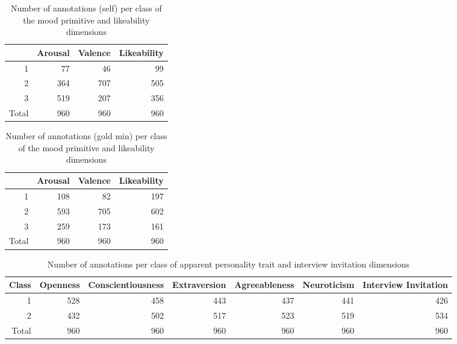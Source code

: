 \begin{table}[h]
\begin{tabular}{|r|r|r|r|}
\hline
\rowcolor[HTML]{C0C0C0} 
\multicolumn{1}{|l|}{\cellcolor[HTML]{C0C0C0}Class} &
  \multicolumn{1}{l|}{\cellcolor[HTML]{C0C0C0}Arousal} &
  \multicolumn{1}{l|}{\cellcolor[HTML]{C0C0C0}Valence} &
  \multicolumn{1}{l|}{\cellcolor[HTML]{C0C0C0}Likeability} \\ \hline
1                           & 77  & 46  & 99  \\
2                           & 364 & 707 & 505 \\
3                           & 519 & 207 & 356 \\ \hline
\multicolumn{1}{|l|}{Total} & 960 & 960 & 960 \\ \hline
\end{tabular}
\caption{Number of annotations (self) per class of the mood primitive and likeability dimensions}
\label{tab:selfcount}
\end{table}

\begin{table}[h]
\begin{tabular}{|r|r|r|r|}
\hline
\rowcolor[HTML]{C0C0C0} 
\multicolumn{1}{|l|}{\cellcolor[HTML]{C0C0C0}Class} &
  \multicolumn{1}{l|}{\cellcolor[HTML]{C0C0C0}Arousal} &
  \multicolumn{1}{l|}{\cellcolor[HTML]{C0C0C0}Valence} &
  \multicolumn{1}{l|}{\cellcolor[HTML]{C0C0C0}Likeability} \\ \hline
1                           & 108 & 82  & 197 \\
2                           & 593 & 705 & 602 \\
3                           & 259 & 173 & 161 \\ \hline
\multicolumn{1}{|l|}{Total} & 960 & 960 & 960 \\ \hline
\end{tabular}
\caption{Number of annotations (gold min) per class of the mood primitive and likeability dimensions}
\label{tab:goldcount}
\end{table}

\begin{table*}[th]
\begin{tabular}{|r|r|r|r|r|r|r|}
\hline
\rowcolor[HTML]{C0C0C0} Class &
  \multicolumn{1}{l|}{Openness} &
  \multicolumn{1}{l|}{Conscientiousness} &
  \multicolumn{1}{l|}{Extraversion} &
  \multicolumn{1}{l|}{Agreeableness} &
  \multicolumn{1}{l|}{Neuroticism} &
  \multicolumn{1}{c|}{Interview Invitation} \\ \hline
1     & 528 & 458 & 443 & 437 & 441 & 426 \\ \hline
2     & 432 & 502 & 517 & 523 & 519 & 534 \\ \hline
Total & 960 & 960 & 960 & 960 & 960 & 960 \\ \hline
\end{tabular}
\caption{Number of annotations per class of apparent personality trait and interview invitation dimensions}
\label{tab:personcount}
\end{table*}

